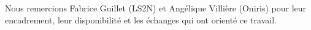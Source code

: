 \documentclass[11pt, french, screen, research-development]{report-rd-info}
\begin{document}
\maketitle


\begin{acknowledgements}
   Nous remercions Fabrice Guillet (LS2N) et Angélique Villière (Oniris) pour leur encadrement, leur disponibilité et les échanges qui ont orienté ce travail.
\end{acknowledgements}


\newpage

\tableofcontents











\listoffigures{}

\listoftables{}

\listofalgorithms{}

\appendix


\end{document}
